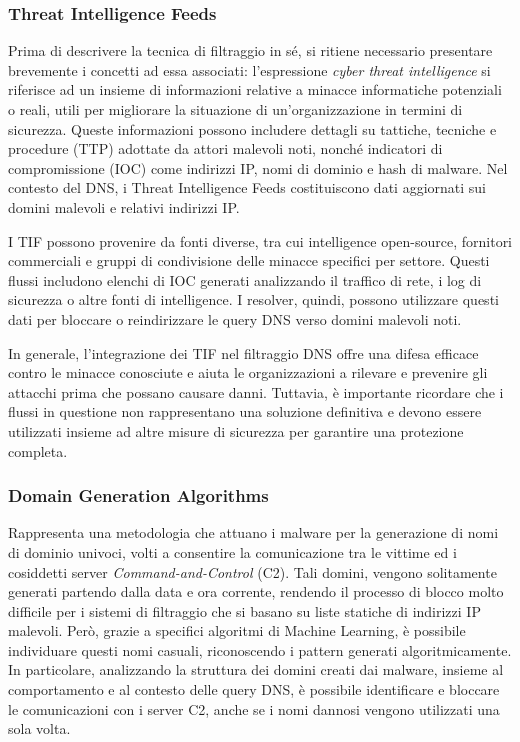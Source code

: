 \subsubsection{Threat Intelligence Feeds}
Prima di descrivere la tecnica di filtraggio in sé, si ritiene necessario presentare brevemente i concetti ad essa associati: l'espressione \textit{cyber threat intelligence} si riferisce ad un insieme di informazioni relative a minacce informatiche potenziali o reali, utili per migliorare la situazione di un'organizzazione in termini di sicurezza.
%
Queste informazioni possono includere dettagli su tattiche, tecniche e procedure (TTP) adottate da attori malevoli noti, nonché indicatori di compromissione (IOC) come indirizzi IP, nomi di dominio e hash di malware. Nel contesto del DNS, i Threat Intelligence Feeds costituiscono dati aggiornati sui domini malevoli e relativi indirizzi IP.

I TIF possono provenire da fonti diverse, tra cui intelligence open-source, fornitori commerciali e gruppi di condivisione delle minacce specifici per settore. Questi flussi includono elenchi di IOC generati analizzando il traffico di rete, i log di sicurezza o altre fonti di intelligence. I resolver, quindi, possono utilizzare questi dati per bloccare o reindirizzare le query DNS verso domini malevoli noti.

In generale, l'integrazione dei TIF nel filtraggio DNS offre una difesa efficace contro le minacce conosciute e aiuta le organizzazioni a rilevare e prevenire gli attacchi prima che possano causare danni. Tuttavia, è importante ricordare che i flussi in questione non rappresentano una soluzione definitiva e devono essere utilizzati insieme ad altre misure di sicurezza per garantire una protezione completa.

\subsubsection{Domain Generation Algorithms}
Rappresenta una metodologia che attuano i malware per la generazione di nomi di dominio univoci, volti a consentire la comunicazione tra le vittime ed i cosiddetti server \textit{Command-and-Control} (C2). Tali domini, vengono solitamente generati partendo dalla data e ora corrente, rendendo il processo di blocco molto difficile per i  sistemi di filtraggio che si basano su liste statiche di indirizzi IP malevoli. Però, grazie a specifici algoritmi di Machine Learning, è possibile individuare questi nomi casuali, riconoscendo i pattern generati algoritmicamente. In particolare, analizzando la struttura dei domini creati dai malware, insieme al comportamento e al contesto delle query DNS, è possibile identificare e bloccare le comunicazioni con i server C2, anche se i nomi dannosi vengono utilizzati una sola volta.

